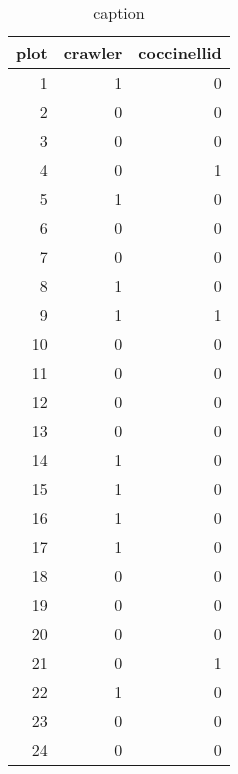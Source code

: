 \documentclass[12pt,letterpaper,english,bibliography=totocnumbered, abstract=on]{scrartcl}
\begin{document}
\begin{table}[h]
	\centering
	\caption{caption}
	\label{rapid_scan_table}
	\begin{tabular}{rrr}
		\toprule
		plot &  crawler &  coccinellid \\
		\midrule
		1 &        1 &            0 \\
		2 &        0 &            0 \\
		3 &        0 &            0 \\
		4 &        0 &            1 \\
		5 &        1 &            0 \\
		6 &        0 &            0 \\
		7 &        0 &            0 \\
		8 &        1 &            0 \\
		9 &        1 &            1 \\
		10 &        0 &            0 \\
		11 &        0 &            0 \\
		12 &        0 &            0 \\
		13 &        0 &            0 \\
		14 &        1 &            0 \\
		15 &        1 &            0 \\
		16 &        1 &            0 \\
		17 &        1 &            0 \\
		18 &        0 &            0 \\
		19 &        0 &            0 \\
		20 &        0 &            0 \\
		21 &        0 &            1 \\
		22 &        1 &            0 \\
		23 &        0 &            0 \\
		24 &        0 &            0 \\
		\bottomrule
	\end{tabular}
\end{table}
\end{document}
